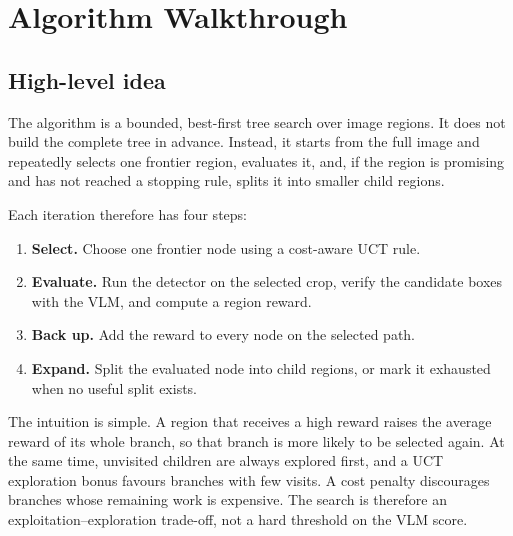 %
%

\providecommand{\indicator}[1]{\mathbf{1}\!\left[#1\right]}
\providecommand{\set}[1]{\mathcal{#1}}
\providecommand{\argmax}{\operatorname*{arg\,max}}
\providecommand{\argmin}{\operatorname*{arg\,min}}
\providecommand{\proc}[1]{\text{\textsc{#1}}}

\section{Algorithm Walkthrough}
\label{sec:algorithm-walkthrough}

\subsection{High-level idea}

The algorithm is a bounded, best-first tree search over image regions. It does
not build the complete tree in advance. Instead, it starts from the full image
and repeatedly selects one frontier region, evaluates it, and, if the region is
promising and has not reached a stopping rule, splits it into smaller child
regions.

Each iteration therefore has four steps:
\begin{enumerate}
  \item \textbf{Select.} Choose one frontier node using a cost-aware UCT rule.
  \item \textbf{Evaluate.} Run the detector on the selected crop, verify the
        candidate boxes with the VLM, and compute a region reward.
  \item \textbf{Back up.} Add the reward to every node on the selected path.
  \item \textbf{Expand.} Split the evaluated node into child regions, or mark it
        exhausted when no useful split exists.
\end{enumerate}

The intuition is simple. A region that receives a high reward raises the
average reward of its whole branch, so that branch is more likely to be selected
again. At the same time, unvisited children are always explored first, and a UCT
exploration bonus favours branches with few visits. A cost penalty discourages
branches whose remaining work is expensive. The search is therefore an
exploitation--exploration trade-off, not a hard threshold on the VLM score.

